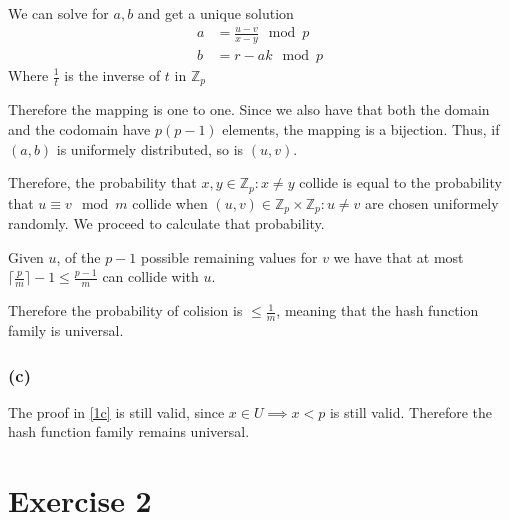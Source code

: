 \documentclass{article}
\begin{document}
We can solve for \(a, b\) and get a unique solution
\begin{align*}
    a &= \frac{u-v}{x-y} \mod{p}\\
    b &= r - ak \mod{p}
\end{align*}
Where \(\frac{1}{t}\) is the inverse of \(t\) in \(\mathbb{Z}_p\)

Therefore the mapping is one to one.
Since we also have that both the domain and the codomain have \(p(p-1)\) elements,
the mapping is a bijection.
Thus, if \((a, b)\) is uniformely distributed, so is \((u, v)\).

Therefore, the probability that \(x, y \in \mathbb{Z}_p: x \neq y\) collide
is equal to the probability that \(u \equiv v \mod{m}\) collide
when \((u, v) \in \mathbb{Z}_p \times \mathbb{Z}_p: u \neq v\) are chosen uniformely randomly.
We proceed to calculate that probability.

Given \(u\), of the \(p-1\) possible remaining values for \(v\) we have that
at most \(\lceil{\frac{p}{m}}\rceil - 1 \leq \frac{p-1}{m}\)
can collide with \(u\). 

Therefore the probability of colision is \(\leq \frac{1}{m}\),
meaning that the hash function family is universal.

\subsubsection*{(c)}\label{1c}

The proof in \ref{1c} is still valid, since \(x \in U \implies x < p\) is still valid.
Therefore the hash function family remains universal.


\section*{Exercise 2}
\end{document}
